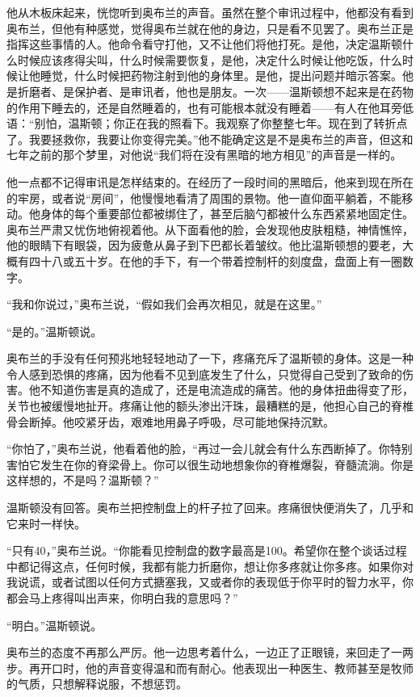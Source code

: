 他从木板床起来，恍惚听到奥布兰的声音。虽然在整个审讯过程中，他都没有看到奥布兰，但他有种感觉，觉得奥布兰就在他的身边，只是看不见罢了。奥布兰正是指挥这些事情的人。他命令看守打他，又不让他们将他打死。是他，决定温斯顿什么时候应该疼得尖叫，什么时候需要恢复，是他，决定什么时候让他吃饭，什么时候让他睡觉，什么时候把药物注射到他的身体里。是他，提出问题并暗示答案。他是折磨者、是保护者、是审讯者，他也是朋友。一次——温斯顿想不起来是在药物的作用下睡去的，还是自然睡着的，也有可能根本就没有睡着——有人在他耳旁低语：``别怕，温斯顿；你正在我的照看下。我观察了你整整七年。现在到了转折点了。我要拯救你，我要让你变得完美。''他不能确定这是不是奥布兰的声音，但这和七年之前的那个梦里，对他说``我们将在没有黑暗的地方相见''的声音是一样的。

他一点都不记得审讯是怎样结束的。在经历了一段时间的黑暗后，他来到现在所在的牢房，或者说``房间''，他慢慢地看清了周围的景物。他一直仰面平躺着，不能移动。他身体的每个重要部位都被绑住了，甚至后脑勺都被什么东西紧紧地固定住。奥布兰严肃又忧伤地俯视着他。从下面看他的脸，会发现他皮肤粗糙，神情憔悴，他的眼睛下有眼袋，因为疲惫从鼻子到下巴都长着皱纹。他比温斯顿想的要老，大概有四十八或五十岁。在他的手下，有一个带着控制杆的刻度盘，盘面上有一圈数字。

``我和你说过，''奥布兰说，``假如我们会再次相见，就是在这里。''

``是的。''温斯顿说。

奥布兰的手没有任何预兆地轻轻地动了一下，疼痛充斥了温斯顿的身体。这是一种令人感到恐惧的疼痛，因为他看不见到底发生了什么，只觉得自己受到了致命的伤害。他不知道伤害是真的造成了，还是电流造成的痛苦。他的身体扭曲得变了形，关节也被缓慢地扯开。疼痛让他的额头渗出汗珠，最糟糕的是，他担心自己的脊椎骨会断掉。他咬紧牙齿，艰难地用鼻子呼吸，尽可能地保持沉默。

``你怕了，''奥布兰说，他看着他的脸，``再过一会儿就会有什么东西断掉了。你特别害怕它发生在你的脊梁骨上。你可以很生动地想象你的脊椎爆裂，脊髓流淌。你是这样想的，不是吗？温斯顿？''

温斯顿没有回答。奥布兰把控制盘上的杆子拉了回来。疼痛很快便消失了，几乎和它来时一样快。

``只有40，''奥布兰说。``你能看见控制盘的数字最高是100。希望你在整个谈话过程中都记得这点，任何时候，我都有能力折磨你，想让你多疼就让你多疼。如果你对我说谎，或者试图以任何方式搪塞我，又或者你的表现低于你平时的智力水平，你都会马上疼得叫出声来，你明白我的意思吗？''

``明白。''温斯顿说。

奥布兰的态度不再那么严厉。他一边思考着什么，一边正了正眼镜，来回走了一两步。再开口时，他的声音变得温和而有耐心。他表现出一种医生、教师甚至是牧师的气质，只想解释说服，不想惩罚。

